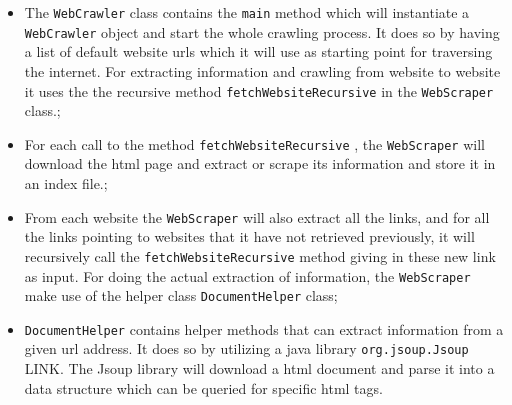 \begin{itemize}
    \item The {\tt WebCrawler} class contains the {\tt main} method which will instantiate a {\tt WebCrawler} object and start the whole crawling process. It does so by having a list of default website urls which it will use as starting point for traversing the internet. For extracting information and crawling from website to website it uses the the recursive method {\tt fetchWebsiteRecursive} in the {\tt WebScraper} class.;
    \item For each call to the method {\tt fetchWebsiteRecursive} , the {\tt WebScraper} will download the html page and extract or scrape its information and store it in an index file.;
    \item From each website the {\tt WebScraper} will also extract all the links, and for all the links pointing to websites that it have not retrieved previously, it will recursively call the {\tt fetchWebsiteRecursive} method giving in these new link as input. For doing the actual extraction of  information, the {\tt WebScraper} make use of the helper class {\tt DocumentHelper} class;
    \item {\tt DocumentHelper} contains helper methods that can extract information from a given url address. It does so by utilizing a java library {\tt org.jsoup.Jsoup} LINK. The Jsoup library will download a html document and parse it into a data structure which can be queried for specific html tags.
\end{itemize}

